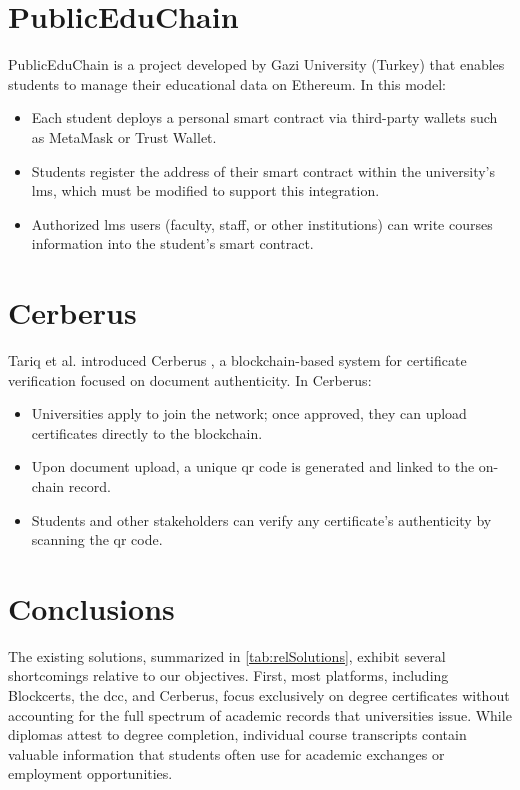 \section{PublicEduChain}
PublicEduChain \cite{mustafa2024publiceduchain} is a project developed by Gazi University (Turkey) that enables students to manage their educational data on Ethereum. In this model:
\begin{itemize}
    \item Each student deploys a personal smart contract via third-party wallets such as MetaMask or Trust Wallet.
    \item Students register the address of their smart contract within the university’s \gls{lms}, which must be modified to support this integration.
    \item Authorized \gls{lms} users (faculty, staff, or other institutions) can write courses information into the student’s smart contract.
\end{itemize}

\section{Cerberus}
\label{sec:cerberus}
Tariq et al. introduced Cerberus \cite{tariq2022cerberus}, a blockchain-based system for certificate verification focused on document authenticity. In Cerberus:
\begin{itemize}
    \item Universities apply to join the network; once approved, they can upload certificates directly to the blockchain.
    \item Upon document upload, a unique \gls{qr} code is generated and linked to the on-chain record.
    \item Students and other stakeholders can verify any certificate’s authenticity by scanning the \gls{qr} code.
\end{itemize}

\section{Conclusions}
The existing solutions, summarized in \cref{tab:relSolutions}, exhibit several shortcomings relative to our objectives. First, most platforms, including Blockcerts, the \gls{dcc}, and Cerberus, focus exclusively on degree certificates without accounting for the full spectrum of academic records that universities issue. While diplomas attest to degree completion, individual course transcripts contain valuable information that students often use for academic exchanges or employment opportunities.

